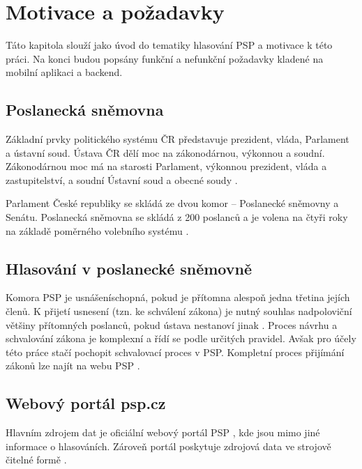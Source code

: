 \chapter{Motivace a požadavky}

\begin{chapterabstract}
Táto kapitola slouží jako úvod do tematiky hlasování PSP a motivace k této práci. Na konci budou popsány funkční a nefunkční požadavky kladené na mobilní aplikaci a backend.
\end{chapterabstract}

\section{Poslanecká sněmovna}
Základní prvky politického systému ČR představuje prezident, vláda, Parlament a ústavní soud. Ústava ČR dělí moc na zákonodárnou, výkonnou a soudní. Zákonodárnou moc má na starosti Parlament, výkonnou prezident, vláda a zastupitelství, a soudní Ústavní soud a obecné \linebreak soudy \cite{political-system}.

Parlament České republiky se skládá ze dvou komor – Poslanecké sněmovny a Senátu. Poslanecká sněmovna se skládá z 200 poslanců a je volena na čtyři roky na základě poměrného volebního systému \cite{psp-book}.

\section{Hlasování v poslanecké sněmovně}
Komora PSP je usnášeníschopná, pokud je přítomna alespoň jedna třetina jejích členů. K přijetí usnesení (tzn. ke schválení zákona) je nutný souhlas nadpoloviční většiny přítomných \linebreak poslanců, pokud ústava nestanoví jinak \cite{psp-book}. Proces návrhu a schvalování zákona je komplexní a řídí se podle určitých pravidel. Avšak pro účely této práce stačí pochopit schvalovací proces \linebreak v PSP. Kompletní proces přijímání zákonů lze najít na webu PSP \cite{psp-vote-process}.

\section{Webový portál psp.cz}
Hlavním zdrojem dat je oficiální webový portál PSP \cite{psp}, kde jsou mimo jiné informace o hlasováních. Zároveň portál poskytuje zdrojová data ve strojově čitelné formě \cite{psp-data}.

